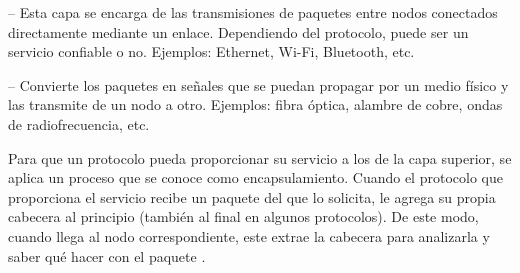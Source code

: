  -- Esta capa se encarga de las transmisiones de
paquetes entre nodos conectados directamente mediante un enlace. Dependiendo
del protocolo, puede ser un servicio confiable o no. Ejemplos: Ethernet, Wi-Fi,
Bluetooth, etc.

 -- Convierte los paquetes en señales que se puedan
propagar por un medio físico y las transmite de un nodo a otro. Ejemplos: fibra
óptica, alambre de cobre, ondas de radiofrecuencia, etc.

Para que un protocolo pueda proporcionar su servicio a los de la capa superior,
se aplica un proceso que se conoce como encapsulamiento. Cuando el protocolo
que proporciona el servicio recibe un paquete del que lo solicita, le agrega su
propia cabecera al principio (también al final en algunos protocolos). De este
modo, cuando llega al nodo correspondiente, este extrae la cabecera para
analizarla y saber qué hacer con el paquete \cite{Kurose2013}.
